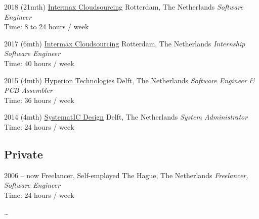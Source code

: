\documentclass[]{friggeri-cv}
\begin{document}
\begin{entrylist}


\entry
{2018 (21mth)}
{\href{https://intermax.nl/}{Intermax Cloudsourcing}}
{Rotterdam, The Netherlands}
{\emph{Software Engineer} \\
Time: 8 to 24 hours / week}


\entry
{2017 (6mth)}
{\href{https://intermax.nl/}{Intermax Cloudsourcing}}
{Rotterdam, The Netherlands}
{\emph{Internship Software Engineer} \\
Time: 40 hours / week}


\entry
{2015 (4mth)}
{\href{https://hyperiontechnologies.nl/}{Hyperion Technologies}}
{Delft, The Netherlands}
{\emph{Software Engineer \& PCB Assembler} \\
Time: 36 hours / week}


\entry
{2014 (4mth)}
{\href{https://systemat-ic.com/}{SystematIC Design}}
{Delft, The Netherlands}
{\emph{System Administrator} \\
Time: 24 hours / week}


\end{entrylist}

\subsection{Private}

\begin{entrylist}


\entry
{2006 -- now}
{Freelancer, Self-employed}
{The Hague, The Netherlands}
{\emph{Freelancer, Software Engineer} \\
Time: 24 hours / week}


\end{entrylist}

\ldots{}

\newpage{}

\end{document}
